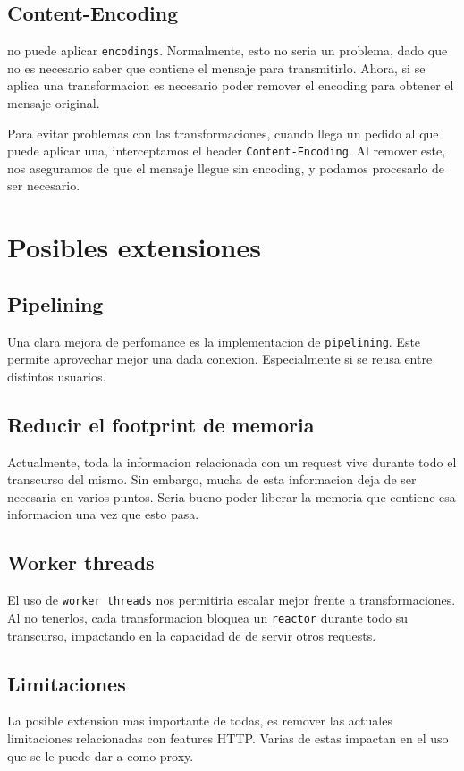 \documentclass[11pt,a4paper,titlepage]{article}
\begin{document}
    \subsection{Content-Encoding}
    \duta no puede aplicar \texttt{encodings}.
    Normalmente, esto no seria un problema, dado que no es necesario saber que contiene el mensaje para transmitirlo.
    Ahora, si se aplica una transformacion es necesario poder remover el encoding para obtener el mensaje original.

    Para evitar problemas con las transformaciones, cuando llega un pedido al que puede aplicar una, interceptamos el header \texttt{Content-Encoding}.
    Al remover este, nos aseguramos de que el mensaje llegue sin encoding, y podamos procesarlo de ser necesario.


\section{Posibles extensiones}
    \subsection{Pipelining}
    Una clara mejora de perfomance es la implementacion de \texttt{pipelining}.
    Este permite aprovechar mejor una dada conexion.
    Especialmente si se reusa entre distintos usuarios.

    \subsection{Reducir el footprint de memoria}
    Actualmente, toda la informacion relacionada con un request vive durante todo el transcurso del mismo.
    Sin embargo, mucha de esta informacion deja de ser necesaria en varios puntos.
    Seria bueno poder liberar la memoria que contiene esa informacion una vez que esto pasa.

    \subsection{Worker threads}
    El uso de \texttt{worker threads} nos permitiria escalar mejor frente a transformaciones.
    Al no tenerlos, cada transformacion bloquea un \texttt{reactor} durante todo su transcurso, impactando en la capacidad de \duta de servir otros requests.

    \subsection{Limitaciones}
    La posible extension mas importante de todas, es remover las actuales limitaciones relacionadas con features HTTP.
    Varias de estas impactan en el uso que se le puede dar a \duta como proxy.
\end{document}
